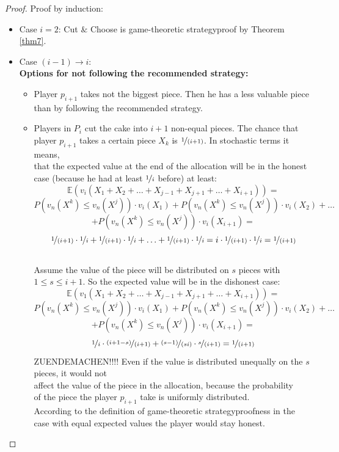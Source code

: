\begin{proof} Proof by induction:
\textcolor{white}{x}
\begin{itemize} \item{Case} $i=2$: Cut $\&$ Choose is game-theoretic strategyproof by Theorem \ref{thm7}.\\
\item{Case} $(i-1) \rightarrow i$:\\ 
\newline
\textbf{Options for not following the recommended strategy:}\\
\begin{itemize}
\item Player $p_{i+1}$ takes not the biggest piece. Then he has a less valuable piece\\than by following the recommended strategy. 
\item Players in $P_i$ cut the cake into $i+1$ non-equal pieces. The chance that\\player $p_{i+1}$ takes a certain piece $X_k$ is $\nicefrac{1}{(i+1)}$. In stochastic terms it means,\\that the expected value at the end of the allocation will be in the honest\\case (because he had at least $\nicefrac{1}{i}$ before) at least: 
$$ \mathbb{E}(v_i(X_1+X_2+\ldots+X_{j-1}+X_{j+1}+\ldots+X_{i+1}))=$$
$$P(v_n(X^k)\leq v_n(X^j))\cdot v_i(X_1)+P(v_n(X^k)\leq v_n(X^j))\cdot v_i(X_2)+\ldots$$$$+P(v_n(X^k)\leq v_n(X^j))\cdot v_i(X_{i+1})=$$
$$\nicefrac{1}{(i+1)}\cdot \nicefrac{1}{i}+\nicefrac{1}{(i+1)}\cdot \nicefrac{1}{i} + \ldots +\nicefrac{1}{(i+1)}\cdot \nicefrac{1}{i}=i\cdot\nicefrac{1}{(i+1)}\cdot \nicefrac{1}{i}=\nicefrac{1}{(i+1)}$$
\\Assume the value of the piece will be distributed on $s$ pieces with\\$1 \leq s \leq i+1$. So the expected value will be in the dishonest case:  $$\mathbb{E}(v_1(X_1+X_2+\ldots+X_{j-1}+X_{j+1}+\ldots+X_{i+1}))=$$$$P(v_n(X^k)\leq v_n(X^j))\cdot v_i(X_1)+P(v_n(X^k)\leq v_n(X^j))\cdot v_i(X_2)+\ldots$$$$+P(v_n(X^k)\leq v_n(X^j))\cdot v_i(X_{i+1})=$$$$ \nicefrac{1}{i} \cdot \nicefrac{(i+1-s)}{(i+1)} + \nicefrac{(s-1)}{(si)}\cdot \nicefrac{s}{(i+1)} =\nicefrac{1}{(i+1)} $$ ZUENDEMACHEN!!!!
Even if the value is distributed unequally on the $s$ pieces, it would not\\affect the value of the piece in the allocation, because the probability\\of the piece the player $p_{i+1}$ take is uniformly distributed.\\
According to the definition of game-theoretic strategyproofness in the\\case with equal expected values the player would stay honest.
\end{itemize}
\end{itemize}
\end{proof}

